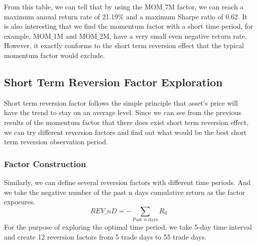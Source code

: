 \documentclass{article}
\begin{document}
From this table, we can tell that by using the MOM$\_$7M factor, we can reach a maximum annual return rate of 21.19$\%$ and a maximum Sharpe ratio of 0.62. It is also interesting that we find the momentum factor with a short time period, for example, MOM$\_$1M and MOM$\_$2M, have a very small even negative return rate. However, it exactly conforms to the short term reversion effect that the typical momentum factor would exclude. 

\subsection{Short Term Reversion Factor Exploration}
Short term reversion factor follows the simple principle that asset's price will have the trend to stay on an average level. Since we can see from the previous results of the momentum factor that there does exist short term reversion effect, we can try different reversion factors and find out what would be the best short term reversion observation period.

\subsubsection{Factor Construction}
Similarly, we can define several reversion factors with different time periods. And we take the negative number of the past n days cumulative return as the factor exposures.
\begin{equation*}
    REV\_{nD} = - \sum_{\text{Past } n \text{ days}}  R_{d}
\end{equation*}
For the purpose of exploring the optimal time period, we take 5-day time interval and create 12 reversion factors from 5 trade days to 55 trade days.
\end{document}
